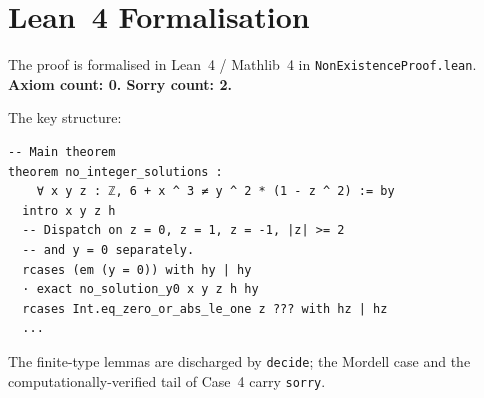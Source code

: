 \documentclass[12pt,a4paper]{article}
\theoremstyle{definition}
\begin{document}
\section{Lean~4 Formalisation}

The proof is formalised in Lean~4 / Mathlib~4 in \texttt{NonExistenceProof.lean}.
\textbf{Axiom count: 0.  Sorry count: 2.}

The key structure:

\begin{lstlisting}[language=Lean4]
-- Main theorem
theorem no_integer_solutions :
    ∀ x y z : ℤ, 6 + x ^ 3 ≠ y ^ 2 * (1 - z ^ 2) := by
  intro x y z h
  -- Dispatch on z = 0, z = 1, z = -1, |z| >= 2
  -- and y = 0 separately.
  rcases (em (y = 0)) with hy | hy
  · exact no_solution_y0 x y z h hy
  rcases Int.eq_zero_or_abs_le_one z ??? with hz | hz
  ...
\end{lstlisting}

The finite-type lemmas are discharged by \texttt{decide}; the Mordell case
and the computationally-verified tail of Case~4 carry \texttt{sorry}.
\end{document}

